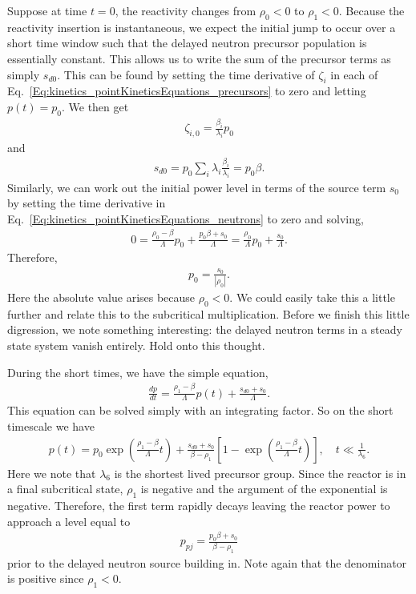 Suppose at time $t = 0$, the reactivity changes from $\rho_0 < 0$ to $\rho_1 < 0$. Because the reactivity insertion is instantaneous, we expect the initial jump to occur over a short time window such that the delayed neutron precursor population is essentially constant. This allows us to write the sum of the precursor terms as simply $s_{d0}$. This can be found by setting the time derivative of $\zeta_i$ in each of Eq.~\eqref{Eq:kinetics_pointKineticsEquations_precursors} to zero and letting $p(t) = p_0$. We then get
\begin{align}
  \zeta_{i,0} = \frac{\beta_{i}}{\lambda_i} p_0
\end{align}
and
\begin{align}
  s_{d0} = p_0 \sum_i \lambda_i \frac{\beta_{i}}{\lambda_i} = p_0 \beta. 
\end{align}
Similarly, we can work out the initial power level in terms of the source term $s_0$ by setting the time derivative in Eq.~\eqref{Eq:kinetics_pointKineticsEquations_neutrons} to zero and solving,
\begin{align}
  0 = \frac{ \rho_0 - \beta }{ \Lambda } p_0 + \frac{p_0 \beta + s_0}{\Lambda} = \frac{\rho_0}{\Lambda} p_0 + \frac{s_0}{\Lambda} . \nonumber
\end{align}
Therefore,
\begin{align}
  p_0 = \frac{ s_0 }{ | \rho_0 | } .
\end{align}
Here the absolute value arises because $\rho_0 < 0$. We could easily take this a little further and relate this to the subcritical multiplication. Before we finish this little digression, we note something interesting: the delayed neutron terms in a steady state system vanish entirely. Hold onto this thought.

During the short times, we have the simple equation,
\begin{align}
  \frac{dp}{dt} = \frac{ \rho_1 - \beta }{ \Lambda } p(t) + \frac{ s_{d0} + s_0 }{ \Lambda } .
\end{align}
This equation can be solved simply with an integrating factor. So on the short timescale we have
\begin{align}
  p(t) = p_0 \exp\left( \frac{\rho_1 - \beta}{\Lambda} t \right) + \frac{ s_{d0} + s_0 }{ \beta - \rho_1 } \left[ 1 - \exp\left( \frac{\rho_1 - \beta}{\Lambda} t \right) \right], \quad t \ll \frac{1}{\lambda_6} .
\end{align}
Here we note that $\lambda_6$ is the shortest lived precursor group. Since the reactor is in a final subcritical state, $\rho_1$ is negative and the argument of the exponential is negative. Therefore, the first term rapidly decays leaving the reactor power to approach a level equal to
\begin{align}
  p_{pj} = \frac{ p_0 \beta + s_0 }{ \beta - \rho_1 } \label{Eq:kinetics_subcriticalPromptJump}
\end{align}
prior to the delayed neutron source building in. Note again that the denominator is positive since $\rho_1 < 0$.

